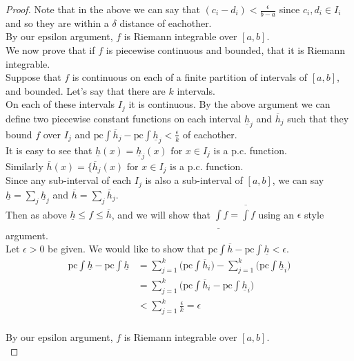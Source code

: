 \documentclass[12pt]{article}
\begin{document}
\begin{proof}
		Note that in the above we can say that $(c_i - d_i) < \frac{\epsilon}{b-a}$ since $c_i,d_i \in I_i$ and so they are within a $\delta$ distance of eachother.\\
		
		By our epsilon argument, $f$ is Riemann integrable over $[a,b]$. \\
		
		We now prove that if $f$ is piecewise continuous and bounded, that it is Riemann integrable. \\
		
		Suppose that $f$ is continuous on each of a finite partition of intervals of $[a,b]$, and bounded. Let's say that there are $k$ intervals.\\
		On each of these intervals $I_j$ it is continuous. By the above argument we can define two piecewise constant functions on each interval $\underline{h}_j$ and $\overline{h}_j$ such that they bound $f$ over $I_j$ and $\text{pc}\int\overline{h}_j - \text{pc}\int \underline {h}_j < \frac{\epsilon}{k}$ of eachother. \\
		It is easy to see that $\underline{h}(x) = \underline{h}_j(x) \text{ for } x \in I_j$ is a p.c. function. \\
		Similarly $\overline{h}(x) = \{\overline{h}_j(x) \text{ for } x \in I_j$ is a p.c. function. \\
		Since any sub-interval of each $I_j$ is also a sub-interval of $[a,b]$, we can say $\underline{h} = \sum\limits_{j}\underline{h}_j$ and $\overline{h} = \sum\limits_{j}\overline{h}_j$. \\
		
		Then as above $\underline{h} \leq f \leq \overline{h}$, and we will show that $\underline{\int}f = \overline{\int}f$ using an $\epsilon$ style argument. \\
		
		Let $\epsilon > 0$ be given. We would like to show that $\text{pc}\int\overline{h} - \text{pc}\int \underline{h} < \epsilon$.\\
		\begin{align*}
			\text{pc}\int\underline{h} - \text{pc}\int\underline{h} & = \sum\limits_{j=1}^k \Big( \text{pc}\int\overline{h}_i \Big) - \sum\limits_{j=1}^k \Big( \text{pc}\int\underline{h}_i \Big) \\
			& = \sum\limits_{j=1}^k \Big( \text{pc}\int\overline{h}_i - \text{pc}\int\underline{h}_i \Big) \\
			& < \sum\limits_{j=1}^k \frac{\epsilon}{k} = \epsilon\\
		\end{align*}
		
		By our epsilon argument, $f$ is Riemann integrable over $[a,b]$. \\		
	\end{proof}
\end{document}
